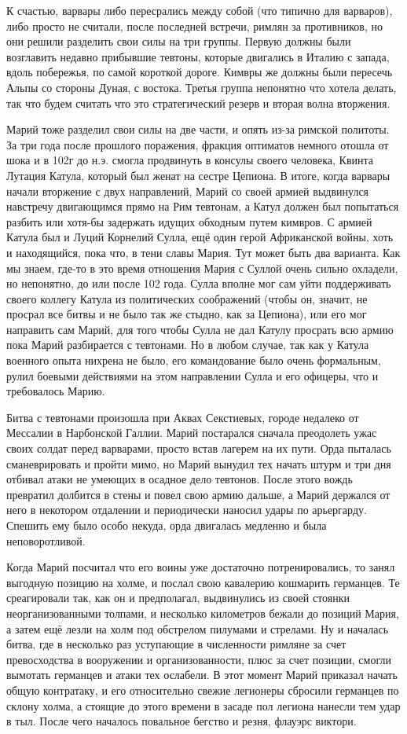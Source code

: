 К счастью, варвары либо пересрались между собой (что типично для варваров), либо просто не считали, после последней встречи, римлян за противников, но они решили разделить свои силы на три группы. Первую должны были возглавить недавно прибывшие тевтоны, которые двигались в Италию с запада, вдоль побережья, по самой короткой дороге. Кимвры же должны были пересечь Альпы со стороны Дуная, с востока. Третья группа непонятно что хотела делать, так что будем считать что это стратегический резерв и вторая волна вторжения.


Марий тоже разделил свои силы на две части, и опять из-за римской политоты. За три года после прошлого поражения, фракция оптиматов немного отошла от шока и в 102г до н.э. смогла продвинуть в консулы своего человека, Квинта Лутация Катула, который был женат на сестре Цепиона. В итоге, когда варвары начали вторжение с двух направлений, Марий со своей армией выдвинулся навстречу двигающимся прямо на Рим тевтонам, а Катул должен был попытаться разбить или хотя-бы задержать идущих обходным путем кимвров. С армией Катула был и Луций Корнелий Сулла, ещё один герой Африканской войны, хоть и находящийся, пока что, в тени славы Мария. Тут может быть два варианта. Как мы знаем, где-то в это время отношения Мария с Суллой очень сильно охладели, но непонятно, до или после 102 года. Сулла вполне мог сам уйти поддерживать своего коллегу Катула из политических соображений (чтобы он, значит, не просрал все битвы и не было так же стыдно, как за Цепиона), или его мог направить сам Марий, для того чтобы Сулла не дал Катулу просрать всю армию пока Марий разбирается с тевтонами. Но в любом случае, так как у Катула военного опыта нихрена не было, его командование было очень формальным, рулил боевыми действиями на этом направлении Сулла и его офицеры, что и требовалось Марию.


Битва с тевтонами произошла при Аквах Секстиевых, городе недалеко от Мессалии в Нарбонской Галлии. Марий постарался сначала преодолеть ужас своих солдат перед варварами, просто встав лагерем на их пути. Орда пыталась сманеврировать и пройти мимо, но Марий вынудил тех начать штурм и три дня отбивал атаки не умеющих в осадное дело тевтонов. После этого вождь превратил долбится в стены и повел свою армию дальше, а Марий держался от него в некотором отдалении и периодически наносил удары по арьергарду. Спешить ему было особо некуда, орда двигалась медленно и была неповоротливой.


Когда Марий посчитал что его воины уже достаточно потренировались, то занял выгодную позицию на холме, и послал свою кавалерию кошмарить германцев. Те среагировали так, как он и предполагал, выдвинулись из своей стоянки неорганизованными толпами, и несколько километров бежали до позиций Мария, а затем ещё лезли на холм под обстрелом пилумами и стрелами. Ну и началась битва, где в несколько раз уступающие в численности римляне за счет превосходства в вооружении и организованности, плюс за счет позиции, смогли вымотать германцев и атаки тех ослабели. В этот момент Марий приказал начать общую контратаку, и его относительно свежие легионеры сбросили германцев по склону холма, а стоящие до этого времени в засаде пол легиона нанесли тем удар в тыл. После чего началось повальное бегство и резня, флауэрс виктори.


